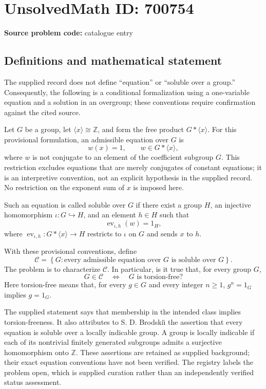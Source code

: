 \documentclass[11pt]{article}
\newcommand{\Z}{\mathbb{Z}}
\begin{document}
\section*{UnsolvedMath ID: 700754}
\textbf{Source problem code:} catalogue entry
\subsection{Definitions and mathematical statement}
The supplied record does not define ``equation'' or ``soluble over a group.'' Consequently, the following is a conditional formalization using a one-variable equation and a solution in an overgroup; these conventions require confirmation against the cited source.

Let \(G\) be a group, let \(\langle x\rangle\cong\Z\), and form the free product \(G*\langle x\rangle\). For this provisional formulation, an admissible equation over \(G\) is
\[
 w(x)=1,\qquad w\in G*\langle x\rangle,
\]
where \(w\) is not conjugate to an element of the coefficient subgroup \(G\). This restriction excludes equations that are merely conjugates of constant equations; it is an interpretive convention, not an explicit hypothesis in the supplied record. No restriction on the exponent sum of \(x\) is imposed here.

Such an equation is called soluble over \(G\) if there exist a group \(H\), an injective homomorphism \(\iota:G\hookrightarrow H\), and an element \(h\in H\) such that
\[
 \operatorname{ev}_{\iota,h}(w)=1_H,
\]
where \(\operatorname{ev}_{\iota,h}:G*\langle x\rangle\to H\) restricts to \(\iota\) on \(G\) and sends \(x\) to \(h\).

With these provisional conventions, define
\[
 \mathcal C=\left\{G:\text{every admissible equation over }G\text{ is soluble over }G\right\}.
\]
The problem is to characterize \(\mathcal C\). In particular, is it true that, for every group \(G\),
\[
 G\in\mathcal C
 \quad\Longleftrightarrow\quad
 G\text{ is torsion-free}?
\]
Here torsion-free means that, for every \(g\in G\) and every integer \(n\geq1\), \(g^n=1_G\) implies \(g=1_G\).

The supplied statement says that membership in the intended class implies torsion-freeness. It also attributes to S. D. Brodski\u{\i} the assertion that every equation is soluble over a locally indicable group. A group is locally indicable if each of its nontrivial finitely generated subgroups admits a surjective homomorphism onto \(\Z\). These assertions are retained as supplied background; their exact equation conventions have not been verified. The registry labels the problem open, which is supplied curation rather than an independently verified status assessment.
\end{document}

